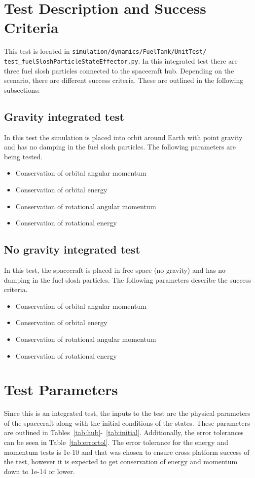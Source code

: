 \section{Test Description and Success Criteria}
This test is located in \texttt{simulation/dynamics/FuelTank/UnitTest/\newline
test\_fuelSloshParticleStateEffector.py}. In this integrated test there are three fuel slosh particles connected to the spacecraft hub.  Depending on the scenario, there are different success criteria. These are outlined in the following subsections:
\subsection{Gravity integrated test}
In this test the simulation is placed into orbit around Earth with point gravity and has no damping in the fuel slosh particles. The following parameters are being tested. 
\begin{itemize}
	\item Conservation of orbital angular momentum
	\item Conservation of orbital energy
	\item Conservation of rotational angular momentum
	\item Conservation of rotational energy
\end{itemize}

\subsection{No gravity integrated test}
In this test, the spacecraft is placed in free space (no gravity) and has no damping in the fuel slosh particles. The following parameters describe the success criteria.
\begin{itemize}
\item Conservation of orbital angular momentum
\item Conservation of orbital energy
\item Conservation of rotational angular momentum
\item Conservation of rotational energy
\end{itemize}

\section{Test Parameters}

Since this is an integrated test, the inputs to the test are the physical parameters of the spacecraft along with the initial conditions of the states. These parameters are outlined in Tables~\ref{tab:hub}-~\ref{tab:initial}. Additionally, the error tolerances can be seen in Table~\ref{tab:errortol}. The error tolerance for the energy and momentum tests is 1e-10 and that was chosen to ensure cross platform success of the test, however it is expected to get conservation of energy and momentum down to 1e-14 or lower. 

